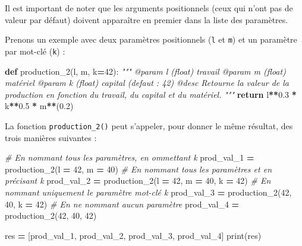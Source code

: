 \documentclass[12pt,]{book}
\newenvironment{Shaded}{\begin{snugshade}}{\end{snugshade}}
\newcommand{\KeywordTok}[1]{\textcolor[rgb]{0.13,0.29,0.53}{\textbf{#1}}}
\newcommand{\DecValTok}[1]{\textcolor[rgb]{0.00,0.00,0.81}{#1}}
\newcommand{\FloatTok}[1]{\textcolor[rgb]{0.00,0.00,0.81}{#1}}
\newcommand{\CommentTok}[1]{\textcolor[rgb]{0.56,0.35,0.01}{\textit{#1}}}
\newcommand{\ControlFlowTok}[1]{\textcolor[rgb]{0.13,0.29,0.53}{\textbf{#1}}}
\newcommand{\OperatorTok}[1]{\textcolor[rgb]{0.81,0.36,0.00}{\textbf{#1}}}
\newcommand{\BuiltInTok}[1]{#1}
\newcommand{\NormalTok}[1]{#1}
\numberwithin{equation}{section}
\numberwithin{countremarque}{section}
\begin{document}
Il est important de noter que les arguments positionnels (ceux qui n'ont
pas de valeur par défaut) doivent apparaître en premier dans la liste
des paramètres.

Prenons un exemple avec deux paramètres positionnels (\texttt{l} et
\texttt{m}) et un paramètre par mot-clé (\texttt{k}) :

\begin{Shaded}
\begin{Highlighting}[]
\KeywordTok{def}\NormalTok{ production_2(l, m, k}\OperatorTok{=}\DecValTok{42}\NormalTok{):}
  \CommentTok{"""}
\CommentTok{  @param l (float) travail}
\CommentTok{  @param m (float) matériel}
\CommentTok{  @param k (float) capital (defaut : 42)}
\CommentTok{  @desc Retourne la valeur de la production en fonction}
\CommentTok{    du travail, du capital et du matériel.}
\CommentTok{  """}
  \ControlFlowTok{return}\NormalTok{ l}\OperatorTok{**}\FloatTok{0.3} \OperatorTok{*}\NormalTok{ k}\OperatorTok{**}\FloatTok{0.5} \OperatorTok{*}\NormalTok{ m}\OperatorTok{**}\NormalTok{(}\FloatTok{0.2}\NormalTok{)}
\end{Highlighting}
\end{Shaded}

La fonction \texttt{production\_2()} peut s'appeler, pour donner le même
résultat, des trois manières suivantes :

\begin{Shaded}
\begin{Highlighting}[]
\CommentTok{# En nommant tous les paramètres, en ommettant k}
\NormalTok{prod_val_1 }\OperatorTok{=}\NormalTok{ production_2(l }\OperatorTok{=} \DecValTok{42}\NormalTok{, m }\OperatorTok{=} \DecValTok{40}\NormalTok{)}
\CommentTok{# En nommant tous les paramètres et en précisant k}
\NormalTok{prod_val_2 }\OperatorTok{=}\NormalTok{ production_2(l }\OperatorTok{=} \DecValTok{42}\NormalTok{, m }\OperatorTok{=} \DecValTok{40}\NormalTok{, k }\OperatorTok{=} \DecValTok{42}\NormalTok{)}
\CommentTok{# En nommant uniquement le paramètre mot-clé k}
\NormalTok{prod_val_3 }\OperatorTok{=}\NormalTok{ production_2(}\DecValTok{42}\NormalTok{, }\DecValTok{40}\NormalTok{, k }\OperatorTok{=} \DecValTok{42}\NormalTok{)}
\CommentTok{# En ne nommant aucun paramètre}
\NormalTok{prod_val_4 }\OperatorTok{=}\NormalTok{ production_2(}\DecValTok{42}\NormalTok{, }\DecValTok{40}\NormalTok{, }\DecValTok{42}\NormalTok{)}

\NormalTok{res }\OperatorTok{=}\NormalTok{ [prod_val_1, prod_val_2, prod_val_3, prod_val_4]}
\BuiltInTok{print}\NormalTok{(res)}
\end{Highlighting}
\end{Shaded}
\end{document}
